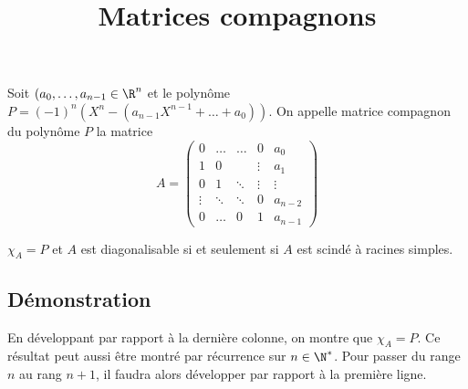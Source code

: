 \documentclass[fontsize=12pt,twoside=false,parskip=half]{scrartcl}
\title{Matrices compagnons}
\date{}
\author{}
\begin{document}
\maketitle
   Soit $(a_0, \ldots, a_{n - 1} \in \R^n$ et le polynôme $P = (-1)^n(X^n - (a_{n - 1}X^{n - 1} + \ldots + a_0))$.
   On appelle matrice compagnon du polynôme $P$ la matrice
   \[
      A = 
      \begin{pmatrix}
         0      & \ldots & \ldots & 0      & a_0\\
         1      & 0      &        & \vdots & a_1\\
         0      & 1      & \ddots & \vdots & \vdots\\
         \vdots & \ddots & \ddots & 0      & a_{n - 2}\\
         0      & \ldots & 0      & 1      & a_{n - 1}
      \end{pmatrix}
   \]
   \begin{Theoreme}
      $\chi_A = P$ et $A$ est diagonalisable si et seulement si $A$ est scindé à racines simples.
   \end{Theoreme}
   \subsection{Démonstration}
      En développant par rapport à la dernière colonne, on montre que $\chi_A = P$.
      Ce résultat peut aussi être montré par récurrence sur $n \in \N^*$. Pour passer du range $n$ au rang $n + 1$,
      il faudra alors développer par rapport à la première ligne.
      
\end{document}
